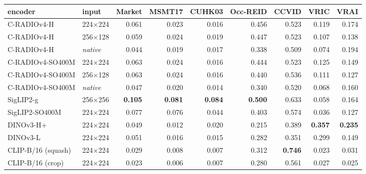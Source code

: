\begin{tabular}{llrrrrrrr}
\toprule
encoder & input & Market & MSMT17 & CUHK03 & Occ-REID & CCVID & VRIC & VRAI \\
\midrule
C-RADIOv4-H & 224$\times$224 & 0.061 & 0.023 & 0.016 & 0.456 & 0.523 & 0.119 & 0.174 \\
C-RADIOv4-H & 256$\times$128 & 0.059 & 0.024 & 0.019 & 0.447 & 0.523 & 0.107 & 0.138 \\
C-RADIOv4-H & \textit{native} & 0.044 & 0.019 & 0.017 & 0.338 & 0.509 & 0.074 & 0.194 \\
C-RADIOv4-SO400M & 224$\times$224 & 0.063 & 0.024 & 0.016 & 0.444 & 0.523 & 0.125 & 0.149 \\
C-RADIOv4-SO400M & 256$\times$128 & 0.063 & 0.024 & 0.016 & 0.440 & 0.536 & 0.111 & 0.127 \\
C-RADIOv4-SO400M & \textit{native} & 0.047 & 0.020 & 0.014 & 0.340 & 0.520 & 0.068 & 0.160 \\
SigLIP2-g & 256$\times$256 & \textbf{0.105} & \textbf{0.081} & \textbf{0.084} & \textbf{0.500} & 0.633 & 0.058 & 0.164 \\
SigLIP2-SO400M & 224$\times$224 & 0.077 & 0.076 & 0.044 & 0.403 & 0.574 & 0.036 & 0.127 \\
DINOv3-H+ & 224$\times$224 & 0.049 & 0.012 & 0.020 & 0.215 & 0.389 & \textbf{0.357} & \textbf{0.235} \\
DINOv3-L & 224$\times$224 & 0.051 & 0.016 & 0.015 & 0.282 & 0.351 & 0.299 & 0.149 \\
CLIP-B/16 (squash) & 224$\times$224 & 0.029 & 0.008 & 0.007 & 0.312 & \textbf{0.746} & 0.023 & 0.031 \\
CLIP-B/16 (crop) & 224$\times$224 & 0.023 & 0.006 & 0.007 & 0.280 & 0.561 & 0.027 & 0.025 \\
\bottomrule
\end{tabular}
